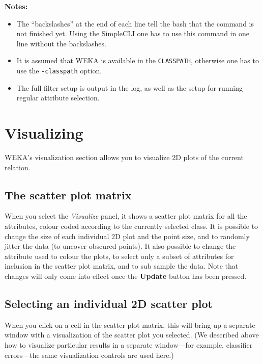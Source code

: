 \noindent \textbf{Notes:}
\begin{itemize}
	\item The ``backslashes'' at the end of each line tell the bash that 
	the command is not finished yet. Using the SimpleCLI one has to  
	use this command in one line without the backslashes.
	
	\item It is assumed that WEKA is available in the \texttt{CLASSPATH}, 
	otherwise one has to use the \texttt{-classpath} option.
	
	\item The full filter setup is output in the log, as well as
	the setup for running regular attribute selection.
\end{itemize}

\newpage

\section{Visualizing}

\begin{center}
\end{center}

WEKA's visualization section allows you to visualize 2D plots of the
current relation.  

\subsection{The scatter plot matrix}

When you select the {\em Visualize} panel, it shows a scatter plot
matrix for all the attributes, colour coded according to the currently
selected class. It is possible to change the size of each individual
2D plot and the point size, and to randomly jitter the data (to
uncover obscured points). It also possible to change the attribute
used to colour the plots, to select only a subset of attributes for
inclusion in the scatter plot matrix, and to sub sample the data. Note
that changes will only come into effect once the \textbf{Update}
button has been pressed.

\subsection{Selecting an individual 2D scatter plot}
 
When you click on a cell in the scatter plot matrix, this will bring
up a separate window with a visualization of the scatter plot you
selected.  (We described above how to visualize particular results in
a separate window---for example, classifier errors---the same
visualization controls are used here.)

